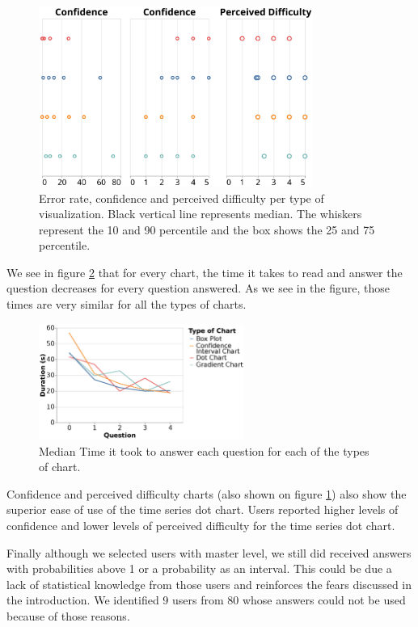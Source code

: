 \documentclass[a4paper,3p,sort&compress]{elsarticle}
\begin{document}
\begin{figure}
  \centering
  \includegraphics[width=0.8\textwidth]{comparison2}
  \caption{\label{figure:errors}Error rate, confidence and perceived difficulty per 
  type of visualization. Black vertical line represents median.
  The whiskers represent the 10 and 90 percentile and the box shows the 25 and 
  75 percentile.}
\end{figure}

We see in figure \ref{figure:duration} that for every chart, the time it takes 
to read and answer the question decreases for every question answered. As we see in the figure, those times 
are very similar for all the types of charts. 

\begin{figure}
  \centering
   \includegraphics[width=0.6\textwidth]{duration_evo2}
  \caption{\label{figure:duration} Median Time it took to answer each question for each of the types of chart.}
\end{figure}  

Confidence and perceived difficulty charts (also shown on figure \ref{figure:errors}) also show the superior ease of use 
of the time series dot chart. Users reported higher levels of confidence and 
lower levels of perceived difficulty for the time series dot chart.


Finally although we selected users with master level, we still did received answers with probabilities 
above 1 or a probability as an interval. This could be due a lack of statistical knowledge from those 
users and reinforces the fears discussed in the introduction. 
We identified 9 users from 80 whose answers could not be used because of those reasons.
\end{document}
